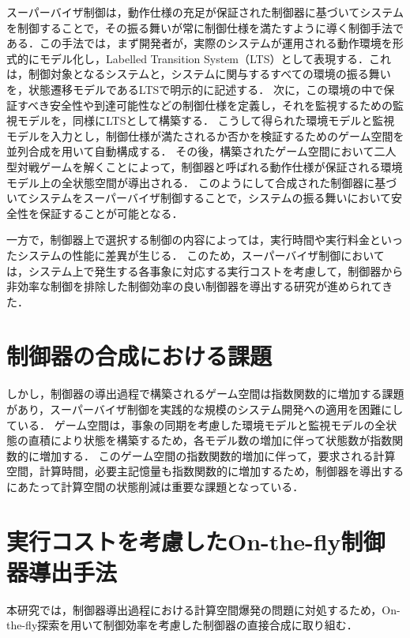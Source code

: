 \documentclass[11pt]{jarticle}
\begin{document}
スーパーバイザ制御は，動作仕様の充足が保証された制御器に基づいてシステムを制御することで，その振る舞いが常に制御仕様を満たすように導く制御手法である．この手法では，まず開発者が，実際のシステムが運用される動作環境を形式的にモデル化し，Labelled Transition System（LTS）として表現する．これは，制御対象となるシステムと，システムに関与するすべての環境の振る舞いを，状態遷移モデルであるLTSで明示的に記述する．
次に，この環境の中で保証すべき安全性や到達可能性などの制御仕様を定義し，それを監視するための監視モデルを，同様にLTSとして構築する．
こうして得られた環境モデルと監視モデルを入力とし，制御仕様が満たされるか否かを検証するためのゲーム空間を並列合成を用いて自動構成する．
その後，構築されたゲーム空間において二人型対戦ゲームを解くことによって，制御器と呼ばれる動作仕様が保証される環境モデル上の全状態空間が導出される．
このようにして合成された制御器に基づいてシステムをスーパーバイザ制御することで，システムの振る舞いにおいて安全性を保証することが可能となる．

一方で，制御器上で選択する制御の内容によっては，実行時間や実行料金といったシステムの性能に差異が生じる．
このため，スーパーバイザ制御においては，システム上で発生する各事象に対応する実行コストを考慮して，制御器から非効率な制御を排除した制御効率の良い制御器を導出する研究が進められてきた\cite{eze}．


\section{制御器の合成における課題}
しかし，制御器の導出過程で構築されるゲーム空間は指数関数的に増加する課題があり，スーパーバイザ制御を実践的な規模のシステム開発への適用を困難にしている．
ゲーム空間は，事象の同期を考慮した環境モデルと監視モデルの全状態の直積により状態を構築するため，各モデル数の増加に伴って状態数が指数関数的に増加する．
このゲーム空間の指数関数的増加に伴って，要求される計算空間，計算時間，必要主記憶量も指数関数的に増加するため，制御器を導出するにあたって計算空間の状態削減は重要な課題となっている．


\section{実行コストを考慮したOn-the-fly制御器導出手法}
本研究では，制御器導出過程における計算空間爆発の問題に対処するため，On-the-fly探索を用いて制御効率を考慮した制御器の直接合成に取り組む．
\end{document}
